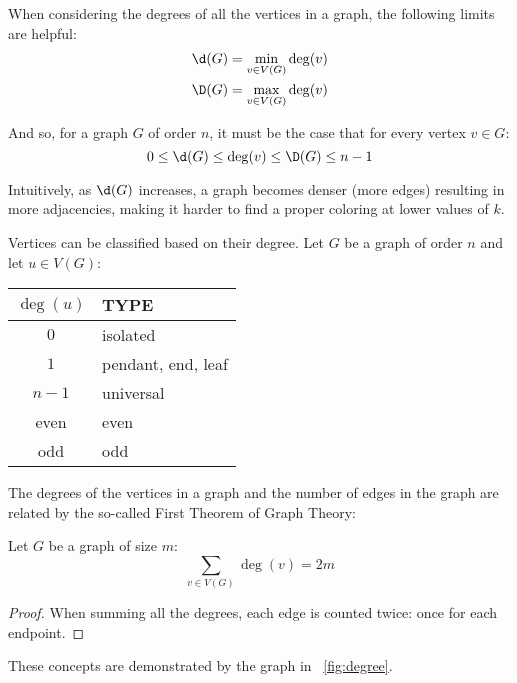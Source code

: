When considering the degrees of all the vertices in a graph, the following limits are helpful:
\begin{gather*}
  \d(G)=\min_{v\in V(G)}\deg(v) \\
  \D(G)=\max_{v\in V(G)}\deg(v)
\end{gather*}

And so, for a graph \(G\) of order \(n\), it must be the case that for every vertex \(v\in G\):
\[0\le\d(G)\le\deg(v)\le\D(G)\le n-1\]

Intuitively, as \(\d(G)\) increases, a graph becomes denser (more edges) resulting in more adjacencies, making it
harder to find a proper coloring at lower values of \(k\).

Vertices can be classified based on their degree.  Let \(G\) be a graph of order \(n\) and let \(u\in V(G)\):

\begin{center}
  \begin{tabular}{|c|l|}
    \hline
    \(\deg(u)\) & TYPE \\
    \hline
    \(0\) & isolated \\
    \(1\) & pendant, end, leaf \\
    \(n-1\) & universal \\
    even & even \\
    odd & odd \\
    \hline
  \end{tabular}
\end{center}

The degrees of the vertices in a graph and the number of edges in the graph are related by the so-called First
Theorem of Graph Theory:

\begin{theorem}
  \label{thm:first}
  Let \(G\) be a graph of size \(m\):
  \[\sum_{v\in V(G)}\deg(v)=2m\]
\end{theorem}

\begin{proof}
  When summing all the degrees, each edge is counted twice: once for each endpoint.
\end{proof}

These concepts are demonstrated by the graph in \figurename~\ref{fig:degree}.

